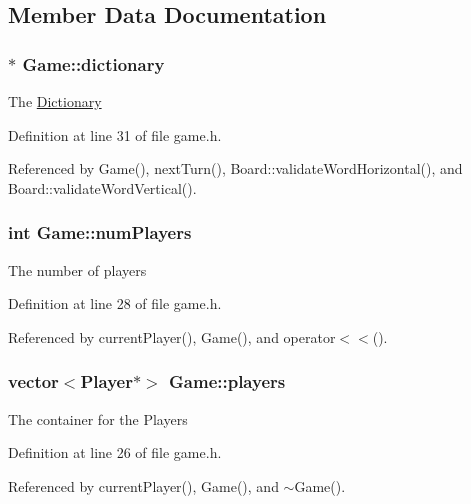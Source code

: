 \subsection{Member Data Documentation}
\hypertarget{class_game_ac02ac16d33949edb2c83b9c6ce48e596}{
\subsubsection[{dictionary}]{$\ast$ Game\-::dictionary}}\label{class_game_ac02ac16d33949edb2c83b9c6ce48e596}
The \hyperlink{class_dictionary}{Dictionary} 

Definition at line 31 of file game.\-h.



Referenced by Game(), next\-Turn(), Board\-::validate\-Word\-Horizontal(), and Board\-::validate\-Word\-Vertical().

\hypertarget{class_game_a7c03c2f209dfde4ef01c739b050159f6}{
\subsubsection[{num\-Players}]{\setlength{\rightskip}{0pt plus 5cm}int Game\-::num\-Players\hspace{0.3cm}{\ttfamily [private]}}}\label{class_game_a7c03c2f209dfde4ef01c739b050159f6}
The number of players 

Definition at line 28 of file game.\-h.



Referenced by current\-Player(), Game(), and operator$<$$<$().

\hypertarget{class_game_a8b1b6150488acf6e0d3a222dbf359842}{
\subsubsection[{players}]{\setlength{\rightskip}{0pt plus 5cm}vector$<${\bf Player}$\ast$$>$ Game\-::players\hspace{0.3cm}{\ttfamily [private]}}}\label{class_game_a8b1b6150488acf6e0d3a222dbf359842}
The container for the Players 

Definition at line 26 of file game.\-h.



Referenced by current\-Player(), Game(), and $\sim$\-Game().

